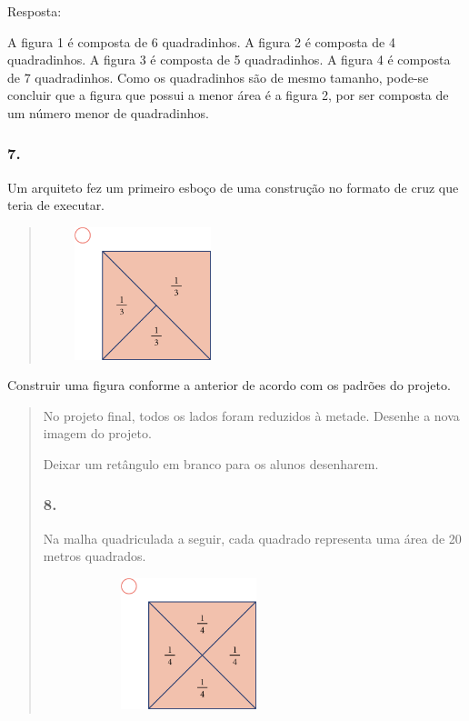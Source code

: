 \begin{enumerate}
\begin{escolha}
\begin{enumerate}
\begin{itemize}
\begin{itemize}
\begin{escolha}
Resposta:

A figura 1 é composta de 6 quadradinhos. A figura 2 é composta de 4 quadradinhos.
A figura 3 é composta de 5 quadradinhos. A figura 4 é composta de 7 quadradinhos.
Como os quadradinhos são de mesmo tamanho, pode-se concluir que a figura
que possui a menor área é a figura 2, por ser composta de um número
menor de quadradinhos.

\subsubsection{7.}\label{section-58}

Um arquiteto fez um primeiro esboço de uma construção no formato de cruz
que teria de executar.

\begin{quote}
\includegraphics[width=2.27520in,height=1.51680in]{media/image66.png}
\end{quote}

Construir uma figura conforme a anterior de acordo com os padrões do
projeto.

\begin{quote}
No projeto final, todos os lados foram reduzidos à metade. Desenhe
a nova imagem do projeto.

\Paulo Deixar um retângulo em branco para os alunos desenharem.

\subsubsection{8.}\label{section-59}

Na malha quadriculada a seguir, cada quadrado representa uma área de 20
metros quadrados.

\includegraphics[width=3.33333in,height=1.50517in]{media/image68.png}


\end{quote}
\end{escolha}
\end{itemize}
\end{itemize}
\end{enumerate}
\end{escolha}
\end{enumerate}

